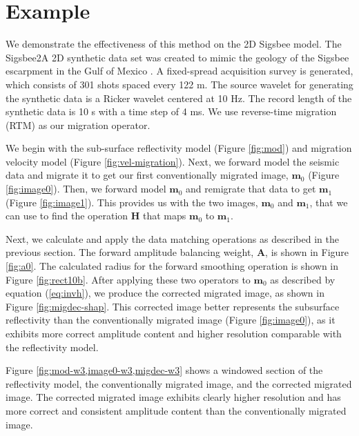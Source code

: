 
\section{Example}

    We demonstrate the effectiveness of this method on the 2D Sigsbee model. 
    The Sigsbee2A 2D synthetic data set was created to mimic the geology of the Sigsbee escarpment in the Gulf of Mexico \cite[]{sigsbee}.
    A fixed-spread acquisition survey is generated, which consists of 301 shots spaced every 122 m.
    The source wavelet for generating the synthetic data is a Ricker wavelet centered at 10 Hz.
    The record length of the synthetic data is 10 s with a time step of 4 ms.
We use reverse-time migration (RTM) as our migration operator.

    We begin with the sub-surface reflectivity model (Figure \ref{fig:mod}) and migration velocity model (Figure \ref{fig:vel-migration}).
    Next, we forward model the seismic data and migrate it to get our first conventionally migrated image, $\mathbf{m}_0$ (Figure \ref{fig:image0}). 
    Then, we forward model $\mathbf{m}_0$ and remigrate that data to get $\mathbf{m}_1$ (Figure \ref{fig:image1}).
    This provides us with the two images, $\mathbf{m}_0$ and $\mathbf{m}_1$, that we can use to find the operation $\mathbf{H}$ that maps $\mathbf{m}_0$ to $\mathbf{m}_1$.

    Next, we calculate and apply the data matching operations as described in the previous section. 
    The forward amplitude balancing weight, $\mathbf{A}$, is shown in Figure \ref{fig:a0}.
    The calculated radius for the forward smoothing operation is shown in Figure \ref{fig:rect10b}.
    After applying these two operators to $\mathbf{m}_0$ as described by equation (\ref{eq:invh}), we produce the corrected migrated image, as shown in Figure \ref{fig:migdec-shap}.
    This corrected image better represents the subsurface reflectivity than the conventionally migrated image (Figure \ref{fig:image0}), as it exhibits more correct amplitude content and higher resolution comparable with the reflectivity model.

    Figure \ref{fig:mod-w3,image0-w3,migdec-w3} shows a windowed section of the reflectivity model, the conventionally migrated image, and the corrected migrated image.
    The corrected migrated image exhibits clearly higher resolution and has more correct and consistent amplitude content than the conventionally migrated image.

